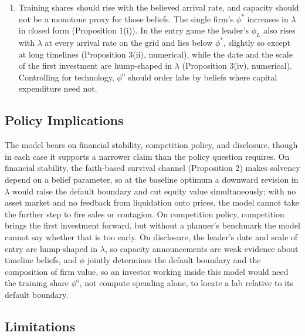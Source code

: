 \documentclass[
  11pt,
  letterpaper,
]{scrartcl}
\begin{document}
\begin{enumerate}
  model's allocation the semi-elasticity of revenue value in \(\lambda\)
  falls from \(2.25\) at \(\lambda = 0.10\) to \(0.30\) at
  \(\lambda = 0.50\).
\item
  Training shares should rise with the believed arrival rate, and
  capacity should not be a monotone proxy for those beliefs. The single
  firm's \(\phi^*\) increases in \(\lambda\) in closed form (Proposition
  1(i)). In the entry game the leader's \(\phi_L\) also rises with
  \(\lambda\) at every arrival rate on the grid and lies below
  \(\phi^*\), slightly so except at long timelines (Proposition 3(ii),
  numerical), while the date and the scale of the first investment are
  hump-shaped in \(\lambda\) (Proposition 3(iv), numerical). Controlling
  for technology, \(\phi^{\mathrm{o}}\) should order labs by beliefs
  where capital expenditure need not.
\end{enumerate}

\subsection{Policy Implications}\label{policy-implications}

The model bears on financial stability, competition policy, and
disclosure, though in each case it supports a narrower claim than the
policy question requires. On financial stability, the faith-based
survival channel (Proposition 2) makes solvency depend on a belief
parameter, so at the baseline optimum a downward revision in \(\lambda\)
would raise the default boundary and cut equity value simultaneously;
with no asset market and no feedback from liquidation onto prices, the
model cannot take the further step to fire sales or contagion. On
competition policy, competition brings the first investment forward, but
without a planner's benchmark the model cannot say whether that is too
early. On disclosure, the leader's date and scale of entry are
hump-shaped in \(\lambda\), so capacity announcements are weak evidence
about timeline beliefs, and \(\phi\) jointly determines the default
boundary and the composition of firm value, so an investor working
inside this model would need the training share \(\phi^{\mathrm{o}}\),
not compute spending alone, to locate a lab relative to its default
boundary.

\subsection{Limitations}\label{limitations}
\end{document}
